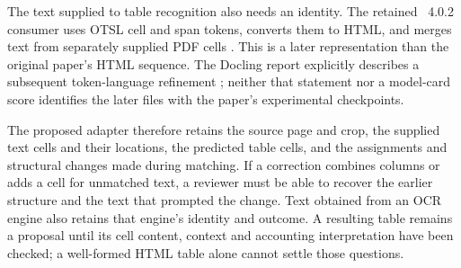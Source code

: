 The text supplied to table recognition also needs an identity. The retained
~4.0.2 consumer uses OTSL cell and span tokens, converts
them to HTML, and merges text from separately supplied PDF cells
\citep{tableformerconsumer2026}. This is a later representation than the
original paper's HTML sequence. The Docling report explicitly describes a
subsequent token-language refinement \citep[Section 3]{nassar2024}; neither
that statement nor a model-card score identifies the later files with the
paper's experimental checkpoints.

The proposed adapter therefore retains the source page and crop, the supplied
text cells and their locations, the predicted table cells, and the assignments
and structural changes made during matching. If a correction combines columns
or adds a cell for unmatched text, a reviewer must be able to recover the
earlier structure and the text that prompted the change. Text obtained from an
OCR engine also retains that engine's identity and outcome. A resulting table
remains a proposal until its cell content, context and accounting interpretation
have been checked; a well-formed HTML table alone cannot settle those questions.

